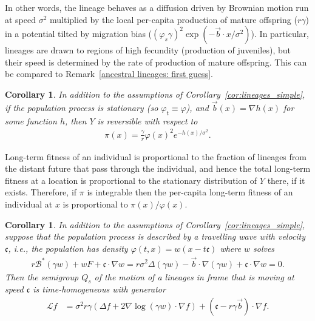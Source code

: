 \documentclass[12pt]{article}
\newtheorem{corollary}[theorem]{Corollary}
\newcommand{\grad}{\nabla}
\newcommand{\DG}{\mathcal{B}}  %
\newcommand{\meanq}{\vec b}    %
\newcommand{\wavespeed}{\mathfrak{c}}    %
\newcommand{\Lgen}{\mathcal{L}}    %
\newcommand{\comment}[1]{{\color{blue} \it #1}}
\numberwithin{equation}{section}
\begin{document}
In other words, 
the lineage behaves as a diffusion driven by Brownian motion 
run at speed $\sigma^2$ multiplied by the local per-capita production of 
mature offspring ($r \gamma$)
in a potential tilted by migration bias
($(\varphi_s \gamma)^2 \exp(-\meanq \cdot x / \sigma^2)$).
In particular, lineages are drawn to regions of high fecundity (production of juveniles), but their
speed is determined by the rate of production of mature offspring.
This can be compared to Remark~\ref{ancestral lineages: first guess}.

\begin{corollary} \label{cor:stationary_dist}
    In addition to the assumptions of Corollary~\ref{cor:lineages_simple},
    if the population process is stationary (so $\varphi_t \equiv \varphi$),
    and $\meanq(x) = \grad h(x)$ for some function $h$,
    then $Y$ is reversible with respect to
    \begin{align}
        \pi(x)
        =
        \frac{\gamma}{r} \varphi(x)^2 e^{-h(x) / \sigma^2} .
    \end{align}
\end{corollary}

Long-term fitness of an individual
is proportional to the fraction of lineages from the distant future that pass through the individual,
and hence the total long-term fitness at a location is proportional to
the stationary distribution of $Y$ there, if it exists.
Therefore,
if $\pi$ is integrable then the per-capita long-term fitness of an individual at $x$
is proportional to $\pi(x) / \varphi(x)$.

\begin{corollary} \label{cor:wavefront}
    In addition to the assumptions of Corollary~\ref{cor:lineages_simple},
    suppose that the population process is described by a travelling wave with 
velocity $\wavespeed$,
    i.e., the population has density
    $\varphi(t, x) = w(x - t \wavespeed)$
    where $w$ solves
    \begin{align*}
        r \DG^* (\gamma w) + w F + \wavespeed \cdot \grad w = 
r\sigma^2\Delta (\gamma w) -\meanq \cdot\grad (\gamma w) +\wavespeed \cdot \grad w =0 .
    \end{align*}
    Then the semigroup $Q_s$
    of the motion of a lineages in frame that is moving at speed $\wavespeed$
    is time-homogeneous with generator
    \begin{align}
\label{Lgen}
        \Lgen f
        &=
        \sigma^2 r \gamma
        \left(
            \Delta f
            +
            2 \grad \log (\gamma w)
            \cdot \grad f
        \right)
        + (\wavespeed - r\gamma \meanq) \cdot \grad f .
    \end{align}
\end{corollary}
\end{document}
